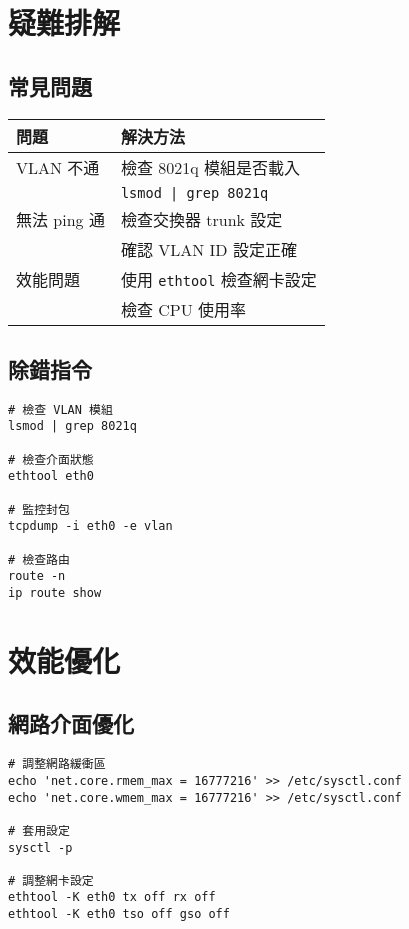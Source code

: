 \documentclass[12pt,a4paper]{article}
\begin{document}
\section{疑難排解}

\subsection{常見問題}

\begin{table}[h]
\centering
\begin{tabular}{|p{4cm}|p{8cm}|}
\hline
\textbf{問題} & \textbf{解決方法} \\
\hline
VLAN 不通 & 檢查 8021q 模組是否載入 \\
& \texttt{lsmod | grep 8021q} \\
\hline
無法 ping 通 & 檢查交換器 trunk 設定 \\
& 確認 VLAN ID 設定正確 \\
\hline
效能問題 & 使用 \texttt{ethtool} 檢查網卡設定 \\
& 檢查 CPU 使用率 \\
\hline
\end{tabular}
\end{table}

\subsection{除錯指令}

\begin{lstlisting}[caption=VLAN 除錯]
# 檢查 VLAN 模組
lsmod | grep 8021q

# 檢查介面狀態
ethtool eth0

# 監控封包
tcpdump -i eth0 -e vlan

# 檢查路由
route -n
ip route show
\end{lstlisting}

\section{效能優化}

\subsection{網路介面優化}

\begin{lstlisting}[caption=效能調整]
# 調整網路緩衝區
echo 'net.core.rmem_max = 16777216' >> /etc/sysctl.conf
echo 'net.core.wmem_max = 16777216' >> /etc/sysctl.conf

# 套用設定
sysctl -p

# 調整網卡設定
ethtool -K eth0 tx off rx off
ethtool -K eth0 tso off gso off
\end{lstlisting}
\end{document}
